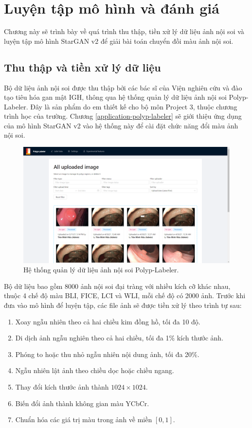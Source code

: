 \documentclass[12pt]{extreport}
\begin{document}
\chapter{Luyện tập mô hình và đánh giá}

Chương này sẽ trình bày về quá trình thu thập, tiền xử lý dữ liệu ảnh nội soi và luyện tập mô hình StarGAN v2 để giải bài toán chuyển đồi màu ảnh nội soi.

\section{Thu thập và tiền xử lý dữ liệu}

Bộ dữ liệu ảnh nội soi được thu thập bởi các bác sĩ của Viện nghiên cứu và đào tạo tiêu hóa gan mật IGH, thông qua hệ thống quản lý dữ liệu ảnh nội soi Polyp-Labeler. Đây là sản phẩm do em thiết kế cho bộ môn Project 3, thuộc chương trình học của trường. Chương \ref{application-polyp-labeler} sẽ giới thiệu ứng dụng của mô hình StarGAN v2 vào hệ thống này để cài đặt chức năng đổi màu ảnh nội soi.

\begin{figure}[H]
    \centering
    \includegraphics[width=0.7\linewidth]{figure34.png}
    \caption{Hệ thống quản lý dữ liệu ảnh nội soi Polyp-Labeler.}
\end{figure}

Bộ dữ liệu bao gồm 8000 ảnh nội soi đại tràng với nhiều kích cỡ khác nhau, thuộc 4 chế độ màu BLI, FICE, LCI và WLI, mỗi chế độ có 2000 ảnh. Trước khi đưa vào mô hình để luyện tập, các file ảnh sẽ được tiền xử lý theo trình tự sau:
\begin{enumerate}
    \item Xoay ngẫu nhiên theo cả hai chiều kim đồng hồ, tối đa 10 độ.
    \item Di dịch ảnh ngẫu nghiên theo cả hai chiều, tối đa 1\% kích thước ảnh.
    \item Phóng to hoặc thu nhỏ ngẫu nhiên nội dung ảnh, tối đa 20\%.
    \item Ngẫu nhiên lật ảnh theo chiều dọc hoặc chiều ngang.
    \item Thay đổi kích thước ảnh thành $ 1024 \times 1024 $.
    \item Biến đổi ảnh thành không gian màu YCbCr.
    \item Chuẩn hóa các giá trị màu trong ảnh về miền $ [0, 1] $.
\end{enumerate}
\end{document}
